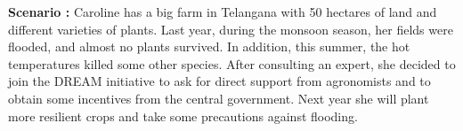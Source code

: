 \begin{flushleft}
\textbf{Scenario :} 
Caroline has a big farm in Telangana with 50 hectares of land and different varieties of plants. Last year, during the monsoon season, her fields were flooded, and almost no plants survived. In addition, this summer, the hot temperatures killed some other species.
After consulting an expert, she decided to join the DREAM initiative to ask for direct support from agronomists and to obtain some incentives from the central government.
Next year she will plant more resilient crops and take some precautions against flooding.
\end{flushleft}